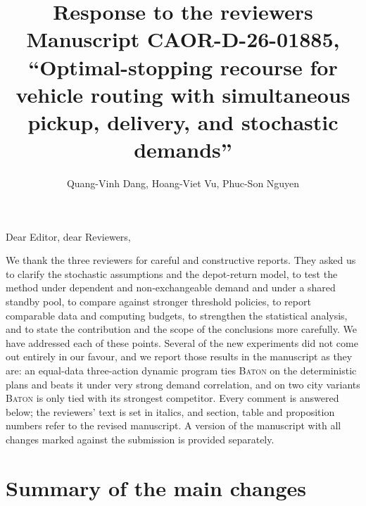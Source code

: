 \documentclass[11pt]{article}
\title{Response to the reviewers\\[4pt]
\large Manuscript CAOR-D-26-01885, ``Optimal-stopping recourse for
vehicle routing with simultaneous pickup, delivery, and stochastic
demands''}
\author{Quang-Vinh Dang, Hoang-Viet Vu, Phuc-Son Nguyen}
\date{}
\newcommand{\BATON}{\textsc{Baton}}
\begin{document}
\maketitle

\noindent Dear Editor, dear Reviewers,

We thank the three reviewers for careful and constructive reports. They
asked us to clarify the stochastic assumptions and the depot-return
model, to test the method under dependent and non-exchangeable demand
and under a shared standby pool, to compare against stronger threshold
policies, to report comparable data and computing budgets, to
strengthen the statistical analysis, and to state the contribution and
the scope of the conclusions more carefully. We have addressed each of
these points. Several of the new experiments did not come out entirely
in our favour, and we report those results in the manuscript as they
are: an equal-data three-action dynamic program ties \BATON{} on the
deterministic plans and beats it under very strong demand correlation,
and on two city variants \BATON{} is only tied with its
strongest competitor. Every comment is answered below; the reviewers' text is set in italics,
and section, table and proposition numbers refer to the revised
manuscript. A version of the manuscript with all changes marked against
the submission is provided separately.

\section*{Summary of the main changes}
\end{document}
